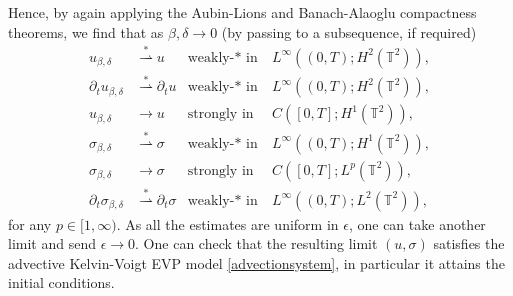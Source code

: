\documentclass[12pt,a4paper]{article}
\theoremstyle{definition}
\theoremstyle{remark}
\numberwithin{equation}{section}
\begin{document}
Hence, by again applying the Aubin-Lions and Banach-Alaoglu compactness theorems, we find that as $\beta, \delta \rightarrow 0$ (by passing to a subsequence, if required)
\begin{align}
    u_{\beta,\delta} & \overset{\ast}{\rightharpoonup} u &  \text{weakly-$* $ in}& ~ L^\infty ((0,T);H^2 (\mathbb{T}^2)), \\
    \partial_t u_{\beta,\delta} & \overset{\ast}{\rightharpoonup} \partial_t u &  \text{weakly-$* $ in}& ~ L^\infty ((0,T);H^2 (\mathbb{T}^2)),  \\
    u_{\beta,\delta} & \rightarrow u & \text{strongly in}& ~ C([0,T];H^1(\mathbb T^2)), \\
    \sigma_{\beta,\delta} &\overset{\ast}{\rightharpoonup} \sigma & \text{weakly-$* $ in}& ~ L^\infty ((0,T);H^1 (\mathbb{T}^2)), \\
    \sigma_{\beta,\delta} &\rightarrow \sigma & \text{strongly in}& ~ C([0,T];L^p(\mathbb T^2)),\\
    \partial_t \sigma_{\beta,\delta} & \overset{\ast}{\rightharpoonup} \partial_t \sigma & \text{weakly-$* $ in}& ~ L^\infty ((0,T); L^2 (\mathbb{T}^2)),
\end{align}
for any $p \in [1, \infty)$. As all the estimates are uniform in $\epsilon$, one can take another limit and send $\epsilon \rightarrow 0$. One can check that the resulting limit $(u,\sigma)$ satisfies the advective Kelvin-Voigt EVP model \eqref{advectionsystem}, in particular it attains the initial conditions.
\end{document}

